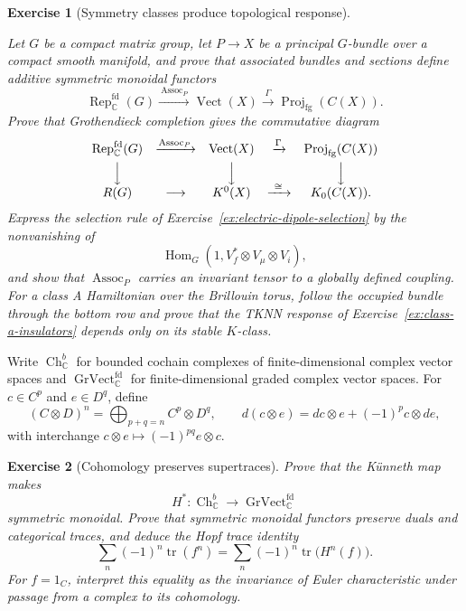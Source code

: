 \documentclass{article}
\newtheorem{exercise}{Exercise}
\newcommand{\trace}{\operatorname{tr}}
\begin{document}
\begin{exercise}[Symmetry classes produce topological response]
\label{ex:monoidal-bridges}\leavevmode\par
\textit{Let $G$ be a compact matrix group, let $P\to X$ be a principal
$G$-bundle over a compact smooth manifold, and prove that associated bundles
and sections define additive symmetric monoidal functors}
\cite{swan-vector-bundles}
\[
\operatorname{Rep}_{\mathbb C}^{\mathrm{fd}}(G)
\xrightarrow{\ \operatorname{Assoc}_P\ }
\operatorname{Vect}(X)
\xrightarrow{\ \Gamma\ }
\operatorname{Proj}_{\mathrm{fg}}(C(X)).
\]
\textit{Prove that Grothendieck completion gives the commutative diagram}
\[
\begin{array}{ccccc}
\operatorname{Rep}_{\mathbb C}^{\mathrm{fd}}(G)
&\xrightarrow{\operatorname{Assoc}_P}&
\operatorname{Vect}(X)
&\xrightarrow{\Gamma}&
\operatorname{Proj}_{\mathrm{fg}}(C(X))\\[4pt]
\Big\downarrow&&\Big\downarrow&&\Big\downarrow\\[-2pt]
R(G)&\longrightarrow&K^0(X)&\xrightarrow{\ \cong\ }&K_0(C(X)).
\end{array}
\]
\textit{Express the selection rule of
Exercise~\ref{ex:electric-dipole-selection} by the nonvanishing of}
\[
\operatorname{Hom}_G(1,V_f^*\otimes V_\mu\otimes V_i),
\]
\textit{and show that $\operatorname{Assoc}_P$ carries an invariant tensor
to a globally defined coupling. For a class A Hamiltonian over the
Brillouin torus, follow the occupied bundle through the bottom row and prove
that the TKNN response of Exercise~\ref{ex:class-a-insulators} depends only
on its stable $K$-class.}
\end{exercise}

Write $\operatorname{Ch}_{\mathbb C}^{b}$ for bounded cochain complexes of
finite-dimensional complex vector spaces and
$\operatorname{GrVect}_{\mathbb C}^{\mathrm{fd}}$ for finite-dimensional
graded complex vector spaces. For $c\in C^p$ and $e\in D^q$, define
\[
(C\otimes D)^n=\bigoplus_{p+q=n}C^p\otimes D^q,
\qquad
d(c\otimes e)=dc\otimes e+(-1)^pc\otimes de,
\]
with interchange $c\otimes e\mapsto(-1)^{pq}e\otimes c$.

\begin{exercise}[Cohomology preserves supertraces]
\leavevmode\par
\textit{Prove that the K\"unneth map makes}
\[
H^*:\operatorname{Ch}_{\mathbb C}^{b}
\longrightarrow\operatorname{GrVect}_{\mathbb C}^{\mathrm{fd}}
\]
\textit{symmetric monoidal. Prove that symmetric monoidal functors preserve
duals and categorical traces, and deduce the Hopf trace identity}
\[
\sum_n(-1)^n\trace(f^n)
=\sum_n(-1)^n\trace\bigl(H^n(f)\bigr).
\]
\textit{For $f=1_C$, interpret this equality as the invariance of Euler
characteristic under passage from a complex to its cohomology.}
\end{exercise}
\end{document}
